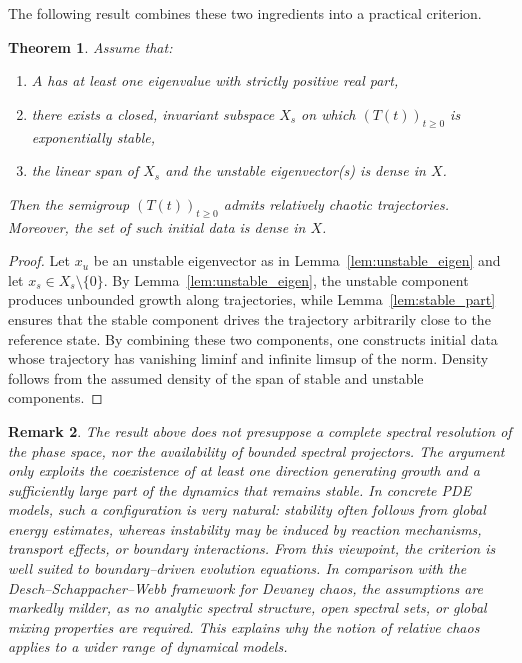 \documentclass[12pt]{article}
\newtheorem{theorem}{Theorem}[section]
\newtheorem{remark}[theorem]{Remark}
\begin{document}
The following result combines these two ingredients into a practical
criterion.

\begin{theorem}\label{thm:spectral_rel}
Assume that:
\begin{enumerate}
\item $A$ has at least one eigenvalue with strictly positive real part, \item there exists a closed, invariant subspace $X_s$ on which $(T(t))_{t\ge 0}$
is exponentially stable,
\item the linear span of $X_s$ and the unstable eigenvector(s) is dense in $X$.
\end{enumerate}
Then the semigroup $(T(t))_{t\ge 0}$ admits relatively chaotic trajectories. Moreover, the set of such initial data is dense in $X$.
\end{theorem}

\begin{proof}
Let $x_u$ be an unstable eigenvector as in Lemma~\ref{lem:unstable_eigen} and let $x_s\in X_s\setminus\{0\}$.
By Lemma~\ref{lem:unstable_eigen}, the unstable component produces unbounded growth along trajectories, while Lemma~\ref{lem:stable_part} ensures that the stable component drives the trajectory arbitrarily close to the reference state. By combining these two components, one constructs initial data whose
trajectory has vanishing liminf and infinite limsup of the norm. Density follows from the assumed density of the span of stable and unstable components.
\end{proof}

\begin{remark}
The result above does not presuppose a complete spectral resolution of the phase space, nor the availability of bounded spectral projectors. The argument only exploits the coexistence of at least one direction generating growth and a sufficiently large part of the dynamics that remains stable. In concrete PDE models, such a configuration is very natural: stability often follows from global energy estimates, whereas instability may be induced by reaction mechanisms, transport effects, or boundary interactions. From this viewpoint, the criterion is well suited to boundary--driven evolution equations. In comparison with the Desch--Schappacher--Webb framework for Devaney chaos, the assumptions are markedly milder, as no analytic spectral structure, open spectral sets, or global mixing properties are required. This explains why the notion of relative chaos applies to a wider range of dynamical models.
\end{remark}
\end{document}

